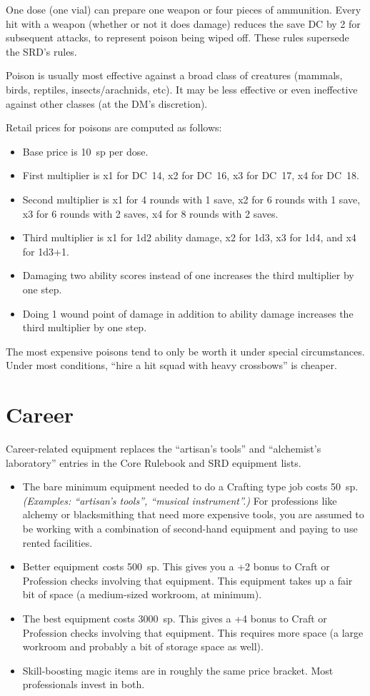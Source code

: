 One dose (one vial) can prepare one weapon or four pieces of ammunition.
Every hit with a weapon (whether or not it does damage) reduces the save DC
by 2 for subsequent attacks, to represent poison being wiped off. These
rules supersede the SRD's rules.

Poison is usually most effective against a broad class of creatures (mammals,
birds, reptiles, insects/arachnids, etc). It may be less effective or even
ineffective against other classes (at the DM's discretion).

Retail prices for poisons are computed as follows:
\begin{itemize}
\item Base price is 10~sp per dose.
\item First multiplier is x1 for DC~14, x2 for DC~16, x3 for DC~17, x4 for
DC~18.
\item Second multiplier is x1 for 4 rounds with 1 save, x2 for 6 rounds with
1 save, x3 for 6 rounds with 2 saves, x4 for 8 rounds with 2 saves.
\item Third multiplier is x1 for 1d2 ability damage, x2 for 1d3, x3 for 1d4,
and x4 for 1d3+1.
\item Damaging two ability scores instead of one increases the third
multiplier by one step.
\item Doing 1 wound point of damage in addition to ability damage increases
the third multiplier by one step.
\end{itemize}

The most expensive poisons tend to only be worth it under special
circumstances. Under most conditions, ``hire a hit squad with heavy
crossbows'' is cheaper.
%

%
%
\section{Career}

Career-related equipment replaces the ``artisan's tools'' and ``alchemist's
laboratory'' entries in the Core Rulebook and SRD equipment lists.

\begin{itemize}
%
\item The bare minimum equipment needed to do a Crafting type job costs
50~sp. \textit{(Examples: ``artisan's tools'', ``musical instrument''.)}
For professions like alchemy or blacksmithing that need more expensive
tools, you are assumed to be working with a combination of second-hand
equipment and paying to use rented facilities.
%
\item Better equipment costs 500~sp. This gives you a +2 bonus to Craft or
Profession checks involving that equipment. This equipment takes up a fair
bit of space (a medium-sized workroom, at minimum).
%
\item The best equipment costs 3000~sp. This gives a +4 bonus to Craft or
Profession checks involving that equipment. This requires more space (a
large workroom and probably a bit of storage space as well).
%
\item Skill-boosting magic items are in roughly the same price bracket.
Most professionals invest in both.
%
\end{itemize}

